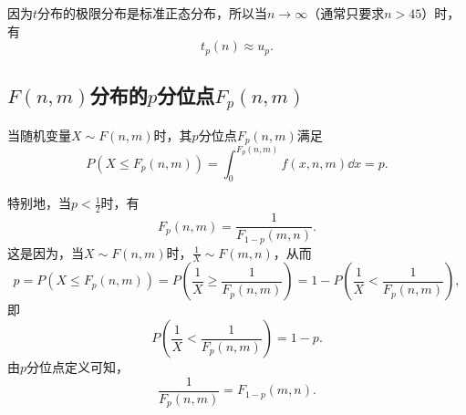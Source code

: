 因为\(t\)分布的极限分布是标准正态分布，所以当\(n\to\infty\)（通常只要求\(n>45\)）时，有\[
t_p(n) \approx u_p.
\]

\subsection{\texorpdfstring{\(F(n,m)\)分布的\(p\)分位点\(F_p(n,m)\)}{F分布的p分位点}}
当随机变量\(X \sim F(n,m)\)时，其\(p\)分位点\(F_p(n,m)\)满足\[
P(X \leq F_p(n,m)) = \int_0^{F_p(n,m)} f(x,n,m) \dd{x} = p.
\]

特别地，当\(p<\frac{1}{2}\)时，有\begin{equation}
F_p(n,m) = \frac{1}{F_{1-p}(m,n)}.
\end{equation}
这是因为，当\(X \sim F(n,m)\)时，\(\frac{1}{X} \sim F(m,n)\)，从而\[
p = P(X \leq F_p(n,m))
= P\left(\frac{1}{X} \geq \frac{1}{F_p(n,m)}\right)
= 1 - P\left(\frac{1}{X} < \frac{1}{F_p(n,m)}\right),
\]即\[
P\left(\frac{1}{X} < \frac{1}{F_p(n,m)}\right) = 1 - p.
\]由\(p\)分位点定义可知，\[
\frac{1}{F_p(n,m)} = F_{1-p}(m,n).
\]
